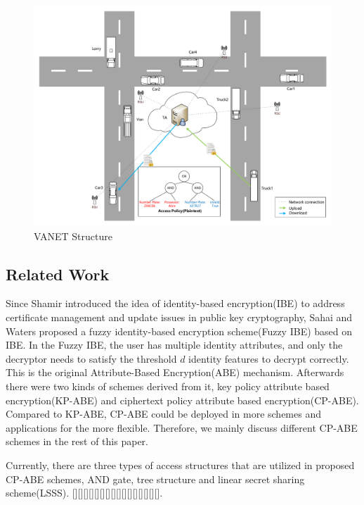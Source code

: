 \documentclass[smallextended]{svjour3}       %
\begin{document}
	\begin{figure}\label{VANET}
		\centering
		\includegraphics[width=4.6in, keepaspectratio]{VANET.pdf}
		\caption{VANET Structure}
	\end{figure}
 
\subsection{Related Work}
	Since Shamir introduced the idea of identity-based encryption(IBE) to address certificate management and update issues in public key cryptography, Sahai and Waters proposed a fuzzy identity-based encryption scheme(Fuzzy IBE) based on IBE. 
	In the Fuzzy IBE, the user has multiple identity attributes, and only the decryptor needs to satisfy the threshold $d$ identity features to decrypt correctly. 
	This is the original Attribute-Based Encryption(ABE) mechanism. 
	Afterwards there were two kinds of schemes derived from it, key policy attribute based encryption(KP-ABE) and ciphertext policy attribute based encryption(CP-ABE). 
	Compared to KP-ABE, CP-ABE could be deployed in more schemes and applications for the more flexible. 
	Therefore, we mainly discuss different CP-ABE schemes in the rest of this paper.

	Currently, there are three types of access structures that are utilized in proposed CP-ABE schemes, AND gate, tree structure and linear secret sharing scheme(LSSS).
	[][][][][][][][][][][][][][][][].
\end{document}
